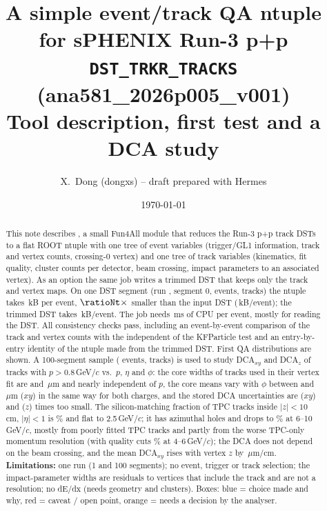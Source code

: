 \documentclass[11pt,a4paper]{article}
\title{A simple event/track QA ntuple for sPHENIX Run-3 p+p\\
\texttt{DST\_TRKR\_TRACKS} (ana581\_2026p005\_v001)\\[4pt]
\large Tool description, first test and a DCA study}
\author{X.~Dong (dongxs) \quad -- \quad draft prepared with Hermes}
\date{\today}
\newcommand{\fcmd}[1]{\texttt{\detokenize{#1}}}
\begin{document}
\maketitle

\begin{abstract}
\noindent
This note describes \fcmd{TrackQATree}, a small Fun4All module that reduces the Run-3 p+p track
DSTs to a flat ROOT ntuple with one tree of event variables (trigger/GL1 information, track and
vertex counts, crossing-0 vertex) and one tree of track variables (kinematics, fit quality,
cluster counts per detector, beam crossing, impact parameters to an associated vertex). As an
option the same job writes a trimmed DST that keeps only the track and vertex maps. On one DST
segment (run \runNo, segment 0, \nEvents{} events, \nTracks{} tracks) the ntuple takes
\sizeNtkB\,kB per event, $\ratioNt\times$ smaller than the input DST (\sizeDSTkB\,kB/event); the
trimmed DST takes \sizeTrimkB\,kB/event. The job needs \cpuMsPerEv\,ms of CPU per event, mostly
for reading the DST. All consistency checks pass, including an event-by-event comparison of the
track and vertex counts with the independent \fcmd{EventInfoTree} of the KFParticle test and an
entry-by-entry identity of the ntuple made from the trimmed DST. First QA distributions are shown.
A 100-segment sample (\sNEvents{} events, \sNTracks{} tracks) is used to study DCA$_{xy}$ and DCA$_z$
of tracks with $p>0.8$\,GeV/$c$ vs.\ $p$, $\eta$ and $\phi$: the core widths of tracks used in their
vertex fit are \sSigXyA{} and \sSigZA\,$\mu$m and nearly independent of $p$, the core means vary with
$\phi$ between \sMeanXyPhiMin{} and \sMeanXyPhiMax\,$\mu$m ($xy$) in the same way for both charges,
and the stored DCA uncertainties are \sPullXyA{} ($xy$) and \sPullZA{} ($z$) times too small.
The silicon-matching fraction of TPC tracks inside $|z|<10$\,cm, $|\eta|<1$ is \eEffAll\% and flat to
2.5\,GeV/$c$; it has \eLowPhiN{} azimuthal holes and drops to \eEffPtHigh\% at 6--10\,GeV/$c$, mostly from poorly
fitted TPC tracks and partly from the worse TPC-only momentum resolution (with quality cuts \rEffQualFour\% at
4--6\,GeV/$c$); the DCA does not depend on
the beam crossing, and the mean DCA$_{xy}$ rises with vertex $z$ by \eSlopeXyVz\,$\mu$m/cm.
\textbf{Limitations:} one run (1 and 100 segments); no event, trigger or track selection; the
impact-parameter widths are residuals to vertices that include the track and are not a
resolution; no dE/dx (needs geometry and clusters).
Boxes: \textcolor{blue!60!black}{blue} = choice made and why,
\textcolor{red!60!black}{red} = caveat / open point,
\textcolor{orange!80!black}{orange} = needs a decision by the analyser.
\end{abstract}

\tableofcontents
\clearpage












\end{document}
